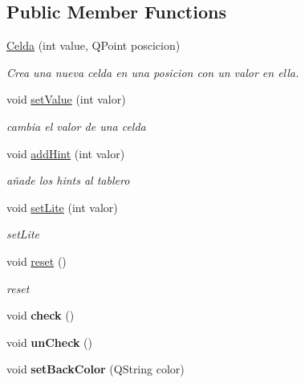 \subsection*{Public Member Functions}
\begin{DoxyCompactItemize}
\item 
\hyperlink{class_celda_a061c79d4a2ac8b4305d8bb989feec1cd}{Celda} (int value, Q\-Point poscicion)
\begin{DoxyCompactList}\small\item\em Crea una nueva celda en una posicion con un valor en ella. \end{DoxyCompactList}\item 
void \hyperlink{class_celda_a26dd4a943c3b516a00c3c3ec56bd56ac}{set\-Value} (int valor)
\begin{DoxyCompactList}\small\item\em cambia el valor de una celda \end{DoxyCompactList}\item 
void \hyperlink{class_celda_a11857539b9f49484bf5344fbe72288bb}{add\-Hint} (int valor)
\begin{DoxyCompactList}\small\item\em añade los hints al tablero \end{DoxyCompactList}\item 
void \hyperlink{class_celda_a2f36ec0296181ee26477fcdf049f2334}{set\-Lite} (int valor)
\begin{DoxyCompactList}\small\item\em set\-Lite \end{DoxyCompactList}\item 
\hypertarget{class_celda_a3e523de46ddbdb2d8497ad67c0009f1e}{void \hyperlink{class_celda_a3e523de46ddbdb2d8497ad67c0009f1e}{reset} ()}\label{class_celda_a3e523de46ddbdb2d8497ad67c0009f1e}

\begin{DoxyCompactList}\small\item\em reset \end{DoxyCompactList}\item 
\hypertarget{class_celda_ac93663c46fa34649bf44d3927c7f0ca1}{void {\bfseries check} ()}\label{class_celda_ac93663c46fa34649bf44d3927c7f0ca1}

\item 
\hypertarget{class_celda_a8420b9e44aed858bf90bc0ea8c0984fa}{void {\bfseries un\-Check} ()}\label{class_celda_a8420b9e44aed858bf90bc0ea8c0984fa}

\item 
\hypertarget{class_celda_af18a6e990908532034599a49784d4ff5}{void {\bfseries set\-Back\-Color} (Q\-String color)}\label{class_celda_af18a6e990908532034599a49784d4ff5}


\end{DoxyCompactItemize}
